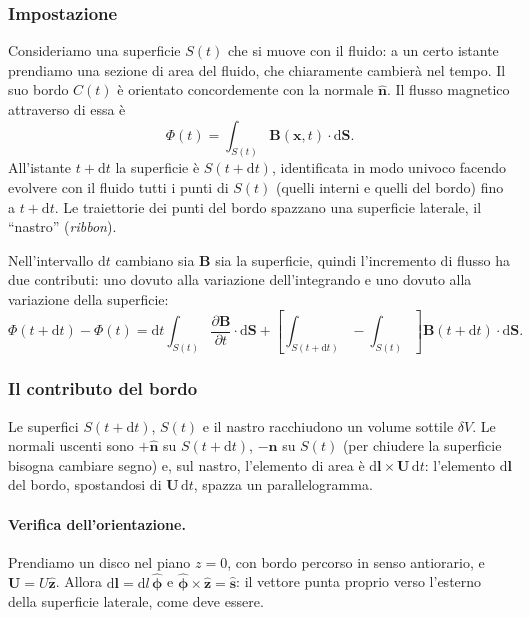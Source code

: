 \subsubsection{Impostazione}

Consideriamo una superficie $S(t)$ che si muove con il fluido: a un certo istante prendiamo una sezione di area del fluido, che chiaramente cambierà nel tempo. Il suo bordo $C(t)$ è orientato concordemente con la normale $\hat{\mathbf{n}}$. Il flusso magnetico attraverso di essa è
\begin{equation}
\Phi(t)=\int_{S(t)}\mathbf{B}(\mathbf{x},t)\cdot\mathrm{d}\mathbf{S}.
\end{equation}
All'istante $t+\mathrm{d}t$ la superficie è $S(t+\mathrm{d}t)$, identificata in modo univoco facendo evolvere con il fluido tutti i punti di $S(t)$ (quelli interni e quelli del bordo) fino a $t+\mathrm{d}t$. Le traiettorie dei punti del bordo spazzano una superficie laterale, il ``nastro'' (\emph{ribbon}).

Nell'intervallo $\mathrm{d}t$ cambiano sia $\mathbf{B}$ sia la superficie, quindi l'incremento di flusso ha due contributi: uno dovuto alla variazione dell'integrando e uno dovuto alla variazione della superficie:
\begin{equation}
\Phi(t+\mathrm{d}t)-\Phi(t)=\mathrm{d}t\int_{S(t)}\frac{\partial\mathbf{B}}{\partial t}\cdot\mathrm{d}\mathbf{S}
+\left[\int_{S(t+\mathrm{d}t)}-\int_{S(t)}\right]\mathbf{B}(t+\mathrm{d}t)\cdot\mathrm{d}\mathbf{S}.
\label{eq:alfven1}
\end{equation}

\subsubsection{Il contributo del bordo}

Le superfici $S(t+\mathrm{d}t)$, $S(t)$ e il nastro racchiudono un volume sottile $\delta V$. Le normali uscenti sono $+\hat{\mathbf{n}}$ su $S(t+\mathrm{d}t)$, $-\hat{\mathbf{n}}$ su $S(t)$ (per chiudere la superficie bisogna cambiare segno) e, sul nastro, l'elemento di area è $\mathrm{d}\mathbf{l}\times\mathbf{U}\,\mathrm{d}t$: l'elemento $\mathrm{d}\mathbf{l}$ del bordo, spostandosi di $\mathbf{U}\,\mathrm{d}t$, spazza un parallelogramma.

\paragraph{Verifica dell'orientazione.} Prendiamo un disco nel piano $z=0$, con bordo percorso in senso antiorario, e $\mathbf{U}=U\hat{\mathbf{z}}$. Allora $\mathrm{d}\mathbf{l}=\mathrm{d}l\,\hat{\boldsymbol{\phi}}$ e $\hat{\boldsymbol{\phi}}\times\hat{\mathbf{z}}=\hat{\mathbf{s}}$: il vettore punta proprio verso l'esterno della superficie laterale, come deve essere.

